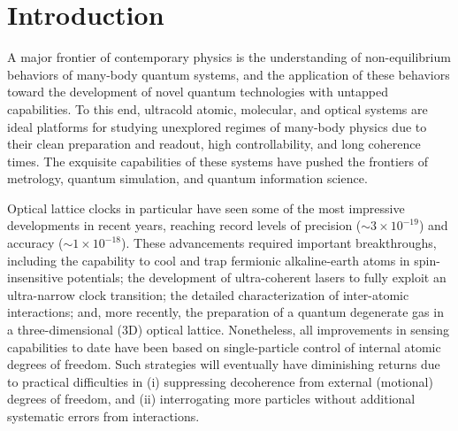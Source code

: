 \documentclass[aps,prx,superscriptaddress,notitlepage,twocolumn,longbibliography]{revtex4-2}
\begin{document}
\section{Introduction}

A major frontier of contemporary physics is the understanding of non-equilibrium behaviors of many-body quantum systems, and the application of these behaviors toward the development of novel quantum technologies with untapped capabilities\cite{eisert2015quantum}.
To this end, ultracold atomic, molecular, and optical systems are ideal platforms for studying unexplored regimes of many-body physics due to their clean preparation and readout, high controllability, and long coherence times\cite{bloch2008manybody, gross2017quantum}.
The exquisite capabilities of these systems have pushed the frontiers of metrology, quantum simulation, and quantum information science.

Optical lattice clocks in particular have seen some of the most impressive developments in recent years, reaching record levels of precision ($\sim 3\times 10^{-19}$)\cite{campbell2017fermidegenerate, marti2018imaging} and accuracy ($\sim 1\times 10^{-18}$)\cite{bloom2014optical, mcgrew2018atomic}.
These advancements required important breakthroughs, including the capability to cool and trap fermionic alkaline-earth atoms in spin-insensitive potentials\cite{takamoto2003spectroscopy, barber2006direct, ye2008quantum}; the development of ultra-coherent lasers\cite{kessler2012sub40mhzlinewidth, cole2013tenfold, matei2017mu} to fully exploit an ultra-narrow clock transition\cite{ludlow2015optical}; the detailed characterization of inter-atomic interactions\cite{scazza2014observation, cappellini2014direct, zhang2014spectroscopic}; and, more recently, the preparation of a quantum degenerate gas in a three-dimensional (3D) optical lattice\cite{campbell2017fermidegenerate, marti2018imaging, goban2018emergence}.
Nonetheless, all improvements in sensing capabilities to date have been based on single-particle control of internal atomic degrees of freedom.
Such strategies will eventually have diminishing returns due to practical difficulties in (i) suppressing decoherence from external (motional) degrees of freedom, and (ii) interrogating more particles without additional systematic errors from interactions\cite{martin2013quantum, ludlow2015optical, marti2018imaging}.
\end{document}
